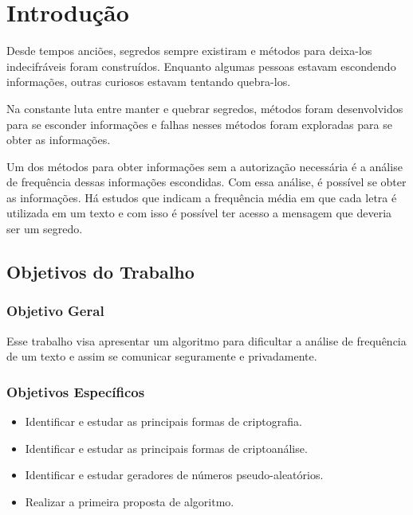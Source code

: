\chapter{Introdução}
\label{introduction}

Desde tempos anciões, segredos sempre existiram e métodos para deixa-los indecifráveis foram construídos. Enquanto algumas pessoas estavam escondendo informações, outras curiosos estavam tentando quebra-los. ~\cite{alexander-maximov} %

Na constante luta entre manter e quebrar segredos, métodos foram desenvolvidos para se esconder informações e falhas nesses métodos foram exploradas para se obter as informações.

Um dos métodos para obter informações sem a autorização necessária é a análise de frequência dessas informações escondidas. Com essa análise, é possível se obter as informações. Há estudos que indicam a frequência média em que cada letra é utilizada em um texto e com isso é possível ter acesso a mensagem que deveria ser um segredo. 

\section{Objetivos do Trabalho}
\label{paper-objectives}

\subsection{Objetivo Geral}
\label{general-objective}
Esse trabalho visa apresentar um algoritmo para dificultar a análise de frequência de um texto e  assim se comunicar seguramente e privadamente.

\subsection{Objetivos Específicos}
\label{specifics-objectives}

\begin{itemize}
	\item Identificar e estudar as principais formas de criptografia.
	\item Identificar e estudar as principais formas de criptoanálise.
	\item Identificar e estudar geradores de números pseudo-aleatórios.
	\item Realizar a primeira proposta de algoritmo.
\end{itemize}

